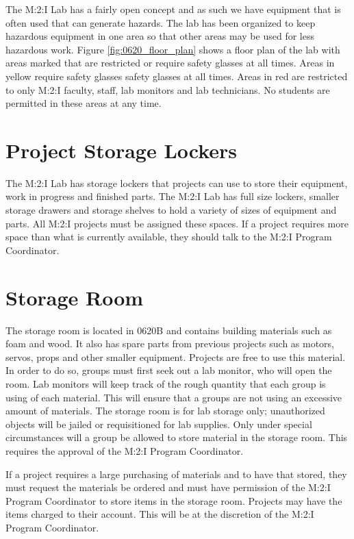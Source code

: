The M:2:I Lab has a fairly open concept and as such we have equipment that is often used that can generate hazards.  The lab has been organized to keep hazardous equipment in one area so that other areas may be used for less hazardous work.  Figure \ref{fig:0620_floor_plan} shows a floor plan of the lab with areas marked that are restricted or require safety glasses at all times.  Areas in yellow require safety glasses safety glasses at all times.  Areas in red are restricted to only M:2:I faculty, staff, lab monitors and lab technicians.  No students are permitted in these areas at any time.

\section{Project Storage Lockers}
The M:2:I Lab has storage lockers that projects can use to store their equipment, work in progress and finished parts.  The M:2:I Lab has full size lockers, smaller storage drawers and storage shelves to hold a variety of sizes of equipment and parts.  All M:2:I projects must be assigned these spaces.  If a project requires more space than what is currently available, they should talk to the M:2:I Program Coordinator.

\section{Storage Room}
The storage room is located in 0620B and contains building materials such as foam and wood. It also has spare parts from previous projects such as motors, servos, props and other smaller equipment.  Projects are free to use this material. In order to do so, groups must first seek out a lab monitor, who will open the room.  Lab monitors will keep track of the rough quantity that each group is using of each material. This will ensure that a groups are not using an excessive amount of materials. The storage room is for lab storage only; unauthorized objects will be jailed or requisitioned for lab supplies. Only under special circumstances will a group be allowed to store material in the storage room. This requires the approval of the M:2:I Program Coordinator.

If a project requires a large purchasing of materials and to have that stored, they must request the materials be ordered and must have permission of the M:2:I Program Coordinator to store items in the storage room.  Projects may have the items charged to their account.  This will be at the discretion of the M:2:I Program Coordinator.  

